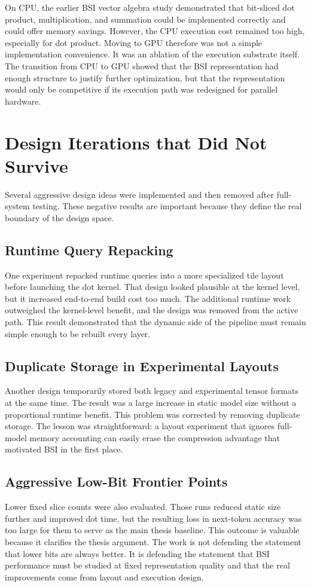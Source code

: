 On CPU, the earlier BSI vector algebra study demonstrated that bit-sliced dot product, multiplication, and summation could be implemented correctly and could offer memory savings. However, the CPU execution cost remained too high, especially for dot product. Moving to GPU therefore was not a simple implementation convenience. It was an ablation of the execution substrate itself. The transition from CPU to GPU showed that the BSI representation had enough structure to justify further optimization, but that the representation would only be competitive if its execution path was redesigned for parallel hardware.

\section{Design Iterations that Did Not Survive}
Several aggressive design ideas were implemented and then removed after full-system testing. These negative results are important because they define the real boundary of the design space.

\subsection{Runtime Query Repacking}
One experiment repacked runtime queries into a more specialized tile layout before launching the dot kernel. That design looked plausible at the kernel level, but it increased end-to-end build cost too much. The additional runtime work outweighed the kernel-level benefit, and the design was removed from the active path. This result demonstrated that the dynamic side of the pipeline must remain simple enough to be rebuilt every layer.

\subsection{Duplicate Storage in Experimental Layouts}
Another design temporarily stored both legacy and experimental tensor formats at the same time. The result was a large increase in static model size without a proportional runtime benefit. This problem was corrected by removing duplicate storage. The lesson was straightforward: a layout experiment that ignores full-model memory accounting can easily erase the compression advantage that motivated BSI in the first place.

\subsection{Aggressive Low-Bit Frontier Points}
Lower fixed slice counts were also evaluated. Those runs reduced static size further and improved dot time, but the resulting loss in next-token accuracy was too large for them to serve as the main thesis baseline. This outcome is valuable because it clarifies the thesis argument. The work is not defending the statement that lower bits are always better. It is defending the statement that BSI performance must be studied at fixed representation quality and that the real improvements come from layout and execution design.

